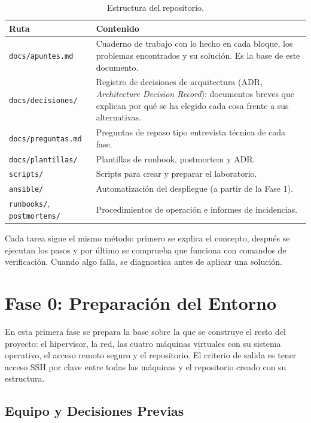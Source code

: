 \documentclass[11pt, a4paper, titlepage]{article}
\newcommand{\cod}[1]{\texttt{#1}}
\begin{document}
\begin{table}[H]
\centering
\small
\begin{tabular}{lp{10cm}}
\toprule
\textbf{Ruta} & \textbf{Contenido} \\
\midrule
\cod{docs/apuntes.md} & Cuaderno de trabajo con lo hecho en cada bloque, los problemas encontrados y su solución. Es la base de este documento. \\
\cod{docs/decisiones/} & Registro de decisiones de arquitectura (ADR, \textit{Architecture Decision Record}): documentos breves que explican por qué se ha elegido cada cosa frente a sus alternativas. \\
\cod{docs/preguntas.md} & Preguntas de repaso tipo entrevista técnica de cada fase. \\
\cod{docs/plantillas/} & Plantillas de runbook, postmortem y ADR. \\
\cod{scripts/} & Scripts para crear y preparar el laboratorio. \\
\cod{ansible/} & Automatización del despliegue (a partir de la Fase 1). \\
\cod{runbooks/}, \cod{postmortems/} & Procedimientos de operación e informes de incidencias. \\
\bottomrule
\end{tabular}
\caption{Estructura del repositorio.}
\label{tab:repositorio}
\end{table}

Cada tarea sigue el mismo método: primero se explica el concepto, después se ejecutan los pasos y por último se comprueba que funciona con comandos de verificación. Cuando algo falla, se diagnostica antes de aplicar una solución.

\section{Fase 0: Preparación del Entorno}

En esta primera fase se prepara la base sobre la que se construye el resto del proyecto: el hipervisor, la red, las cuatro máquinas virtuales con su sistema operativo, el acceso remoto seguro y el repositorio. El criterio de salida es tener acceso SSH por clave entre todas las máquinas y el repositorio creado con su estructura.

\subsection{Equipo y Decisiones Previas}
\end{document}
